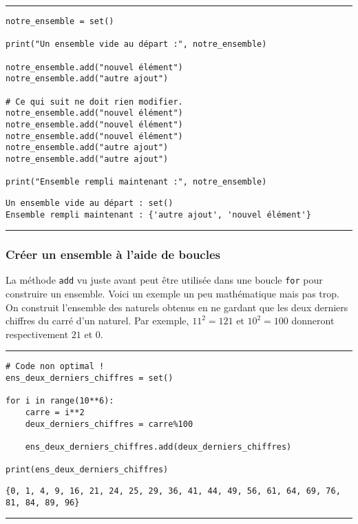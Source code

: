 \bigskip
{\hrule height .5mm}
\begin{verbatim}
notre_ensemble = set()

print("Un ensemble vide au départ :", notre_ensemble)

notre_ensemble.add("nouvel élément")
notre_ensemble.add("autre ajout")

# Ce qui suit ne doit rien modifier.
notre_ensemble.add("nouvel élément")
notre_ensemble.add("nouvel élément")
notre_ensemble.add("nouvel élément")
notre_ensemble.add("autre ajout")
notre_ensemble.add("autre ajout")

print("Ensemble rempli maintenant :", notre_ensemble)
\end{verbatim}
 \color{ForestGreen}
\vspace{-1.5em}
\begin{verbatim}
Un ensemble vide au départ : set()
Ensemble rempli maintenant : {'autre ajout', 'nouvel élément'}
\end{verbatim} \color{Black}
{\hrule height .5mm}
\bigskip


\subsubsection{Créer un ensemble à l'aide de boucles}

La méthode \texttt{add} vu juste avant peut être utilisée dans une boucle \texttt{for} pour construire un ensemble. Voici un exemple un peu mathématique mais pas trop. On construit l'ensemble des naturels obtenus en ne gardant que les deux derniers chiffres du carré d'un naturel. Par exemple, $11^2 = 121$ et $10^2 = 100$  donneront respectivement $21$ et $0$.


\bigskip
{\hrule height .5mm}
\begin{verbatim}
# Code non optimal !
ens_deux_derniers_chiffres = set()

for i in range(10**6):
    carre = i**2
    deux_derniers_chiffres = carre%100

    ens_deux_derniers_chiffres.add(deux_derniers_chiffres)

print(ens_deux_derniers_chiffres)
\end{verbatim}
 \color{ForestGreen}
\vspace{-1.5em}
\begin{verbatim}
{0, 1, 4, 9, 16, 21, 24, 25, 29, 36, 41, 44, 49, 56, 61, 64, 69, 76, 81, 84, 89, 96}
\end{verbatim} \color{Black}
{\hrule height .5mm}
\bigskip


